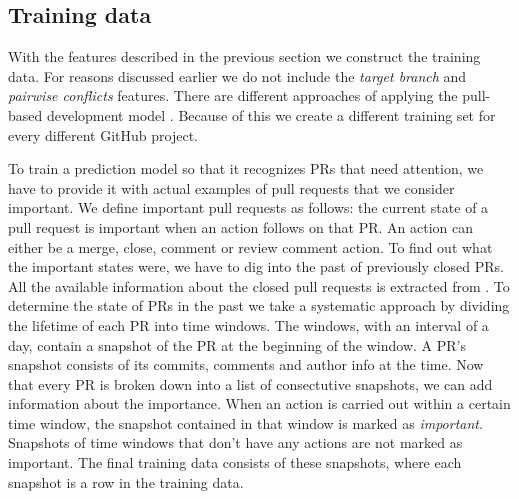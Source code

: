 \subsection{Training data}
\label{sec:training}

With the features described in the previous section we construct the training data.
For reasons discussed earlier we do not include the \emph{target branch} and \emph{pairwise conflicts} features.
There are different approaches of applying the pull-based development model \cite{GPD14}.
Because of this we create a different training set for every different GitHub project.

To train a prediction model so that it recognizes PRs that need attention, we have to provide it with actual examples of pull requests that we consider important.
We define important pull requests as follows: the current state of a pull request is important when an action follows on that PR.
An action can either be a merge, close, comment or review comment action.
To find out what the important states were, we have to dig into the past of previously closed PRs.
All the available information about the closed pull requests is extracted from \ghtorrent.
To determine the state of PRs in the past we take a systematic approach by dividing the lifetime of each PR into time windows.
The windows, with an interval of a day, contain a snapshot of the PR at the beginning of the window.
A PR's snapshot consists of its commits, comments and author info at the time.
Now that every PR is broken down into a list of consectutive snapshots, we can add information about the importance.
When an action is carried out within a certain time window, the snapshot contained in that window is marked as \emph{important}.
Snapshots of time windows that don't have any actions are not marked as important.
The final training data consists of these snapshots, where each snapshot is a row in the training data.
